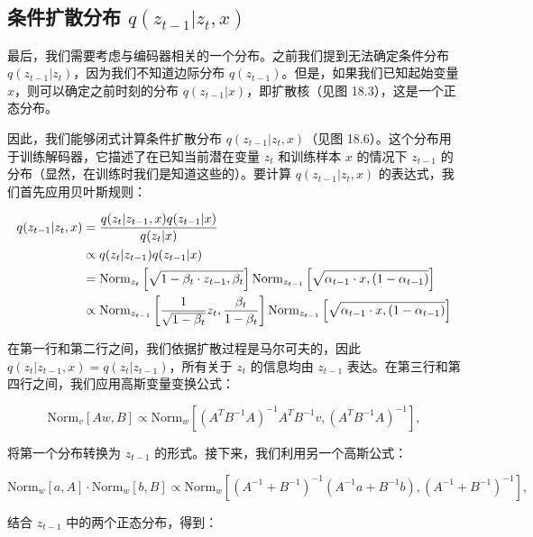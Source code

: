 \documentclass[lang=cn,newtx,10pt,scheme=chinese]{elegantbook}
\begin{document}
\subsection{条件扩散分布 \texorpdfstring{\(q(z_{t-1}|z_t, x)\)}{} }
最后，我们需要考虑与编码器相关的一个分布。之前我们提到无法确定条件分布 \(q(z_{t-1}|z_t)\)，因为我们不知道边际分布 \(q(z_{t-1})\)。但是，如果我们已知起始变量 \(x\)，则可以确定之前时刻的分布 \(q(z_{t-1}|x)\)，即扩散核（见图 18.3），这是一个正态分布。

因此，我们能够闭式计算条件扩散分布 \(q(z_{t-1}|z_t, x)\)（见图 18.6）。这个分布用于训练解码器，它描述了在已知当前潜在变量 \(z_t\) 和训练样本 \(x\) 的情况下 \(z_{t-1}\) 的分布（显然，在训练时我们是知道这些的）。要计算 \(q(z_{t-1}|z_t, x)\) 的表达式，我们首先应用贝叶斯规则：



\begin{align}
q(z_{t-1}|z_t, x) &= \frac{q(z_t|z_{t-1}, x)q(z_{t-1}|x)}{q(z_t|x)} \notag \\
&\propto q(z_t|z_{t-1})q(z_{t-1}|x) \notag \\
&= \text{Norm}_{z_t} \left[ \sqrt{1 - \beta_t \cdot z_{t-1}, \beta_t} \right] \text{Norm}_{z_{t-1}} \left[ \sqrt{\alpha_{t-1} \cdot x, (1 - \alpha_{t-1})} \right] \notag \\
&\propto \text{Norm}_{z_{t-1}} \left[ \frac{1}{\sqrt{1 - \beta_t}} z_t, \frac{\beta_t}{1 - \beta_t} \right] \text{Norm}_{z_{t-1}} \left[ \sqrt{\alpha_{t-1} \cdot x, (1 - \alpha_{t-1})} \right] 
\end{align} 


在第一行和第二行之间，我们依据扩散过程是马尔可夫的，因此 \(q(z_t|z_{t-1}, x) = q(z_t|z_{t-1})\)，所有关于 \(z_t\) 的信息均由 \(z_{t-1}\) 表达。在第三行和第四行之间，我们应用高斯变量变换公式：

\begin{equation}
\text{Norm}_{v} [Aw, B] \propto \text{Norm}_{w} \left[ (A^T B^{-1} A)^{-1} A^T B^{-1} v, (A^T B^{-1} A)^{-1} \right], 
\end{equation}

将第一个分布转换为 \(z_{t-1}\) 的形式。接下来，我们利用另一个高斯公式：

\begin{equation}
\text{Norm}_{w}[a, A] \cdot \text{Norm}_{w}[b, B] \propto \text{Norm}_{w} \left[ (A^{-1} + B^{-1})^{-1} (A^{-1} a + B^{-1} b), (A^{-1} + B^{-1})^{-1} \right], 
\end{equation}

结合 \(z_{t-1}\) 中的两个正态分布，得到：
\end{document}
